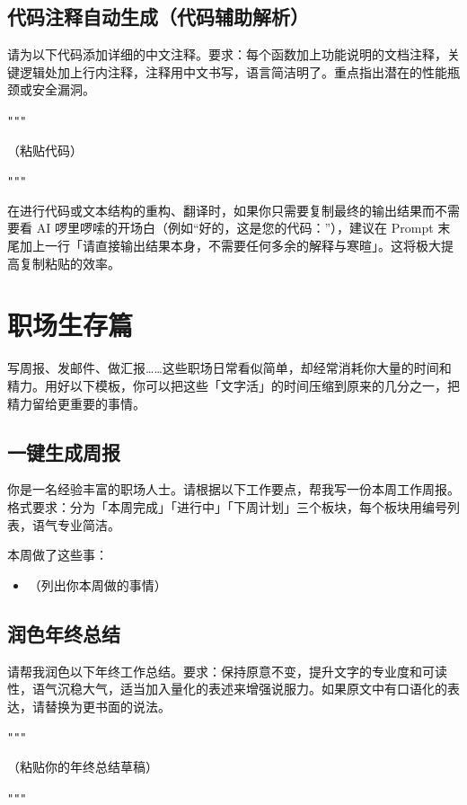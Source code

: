 \subsection*{代码注释自动生成（代码辅助解析）}

\begin{promptbox}
请为以下代码添加详细的中文注释。要求：每个函数加上功能说明的文档注释，关键逻辑处加上行内注释，注释用中文书写，语言简洁明了。重点指出潜在的性能瓶颈或安全漏洞。

\verb|"""|

（粘贴代码）

\verb|"""|
\end{promptbox}

\begin{tipbox}
在进行代码或文本结构的重构、翻译时，如果你只需要复制最终的输出结果而不需要看 AI 啰里啰嗦的开场白（例如“好的，这是您的代码：”），建议在 Prompt 末尾加上一行「请直接输出结果本身，不需要任何多余的解释与寒暄」。这将极大提高复制粘贴的效率。
\end{tipbox}

\section{职场生存篇}

写周报、发邮件、做汇报……这些职场日常看似简单，却经常消耗你大量的时间和精力。用好以下模板，你可以把这些「文字活」的时间压缩到原来的几分之一，把精力留给更重要的事情。

\subsection*{一键生成周报}

\begin{promptbox}
你是一名经验丰富的职场人士。请根据以下工作要点，帮我写一份本周工作周报。格式要求：分为「本周完成」「进行中」「下周计划」三个板块，每个板块用编号列表，语气专业简洁。

本周做了这些事：
\begin{itemize}
  \item （列出你本周做的事情）
\end{itemize}
\end{promptbox}

\subsection*{润色年终总结}

\begin{promptbox}
请帮我润色以下年终工作总结。要求：保持原意不变，提升文字的专业度和可读性，语气沉稳大气，适当加入量化的表述来增强说服力。如果原文中有口语化的表达，请替换为更书面的说法。

\verb|"""|

（粘贴你的年终总结草稿）

\verb|"""|
\end{promptbox}

